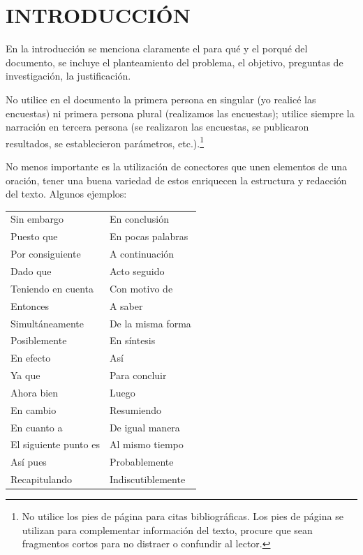 \section{INTRODUCCIÓN}

En la introducción se menciona claramente el para qué y el porqué del documento, se incluye el planteamiento del problema, el objetivo, preguntas de investigación, la justificación.

No utilice en el documento la primera persona en singular (yo realicé las encuestas) ni primera persona plural (realizamos las encuestas); utilice siempre la narración en tercera persona (se realizaron las encuestas, se publicaron resultados, se establecieron parámetros, etc.).\footnote{No utilice los pies de página para citas bibliográficas. Los pies de página se utilizan para complementar información del texto, procure que sean fragmentos cortos para no distraer o confundir al lector.}

No menos importante es la utilización de conectores que unen elementos de una oración, tener una buena variedad de estos enriquecen la estructura y redacción del texto. Algunos ejemplos:

\begin{tabular}{ll}
    Sin embargo         & En conclusión \\
    Puesto que          & En pocas palabras \\
    Por consiguiente    & A continuación \\
    Dado que            & Acto seguido \\
    Teniendo en cuenta  & Con motivo de \\
    Entonces            & A saber \\
    Simultáneamente     & De la misma forma \\
    Posiblemente        & En síntesis \\
    En efecto           & Así \\
    Ya que              & Para concluir \\
    Ahora bien          & Luego \\
    En cambio           & Resumiendo \\
    En cuanto a         & De igual manera \\
    El siguiente punto es& Al mismo tiempo \\
    Así pues            & Probablemente \\
    Recapitulando       & Indiscutiblemente 
\end{tabular}


